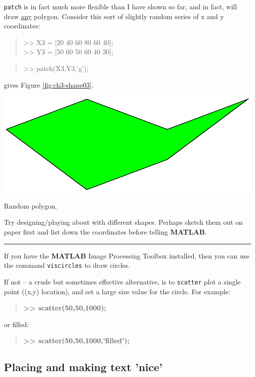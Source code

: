 \documentclass{tufte-book} %
\newenvironment{docspec}{\begin{quotation}\ttfamily\parskip0pt\parindent0pt\ignorespaces}{\end{quotation}}
\newenvironment{docspecbold}{\begin{quotation}\ttfamily\bfseries\parskip0pt\parindent0pt\ignorespaces}{\end{quotation}}
\begin{document}
\texttt{patch} is in fact much more flexible than I have shown so far, and in fact, will draw \uline{any} polygon. Consider this sort of slightly random series of x and y coordinates: 
\begin{docspec}
>> X3 = [20 40 60 80 60 40];\\
>> Y3 = [50 60 50 60 40 30];
\end{docspec}
\begin{docspec}
>> patch(X3,Y3,'g');
\end{docspec}
gives Figure \ref{fig:ch3-shape03}.

\begin{marginfigure}[-0.0in]
\includegraphics[width=\linewidth]{ch3-shape03.eps}
\caption{Random polygon.}
\label{fig:ch3-shape03}
\end{marginfigure}

Try designing/playing about with different shapes. Perhaps sketch them out on paper first and list down the coordinates before telling \textbf{MATLAB}.

\vspace{1mm}
\noindent\rule{4cm}{0.5pt}
\vspace{2mm}

\noindent If you have the \textbf{MATLAB} \textsf{Image Processing Toolbox} installed, then you can use the command \texttt{viscircles} to draw circles.

If not -- a crude but sometimes effective alternative, is to \texttt{scatter} plot a single point ((x,y) location), and set a large size value for the circle. For example:
\begin{docspecbold}
>> scatter(50,50,1000);
\end{docspecbold}
or filled:
\begin{docspecbold}
>> scatter(50,50,1000,'filled');
\end{docspecbold}


\newpage
\subsection{Placing and making text 'nice'}
\end{document}
